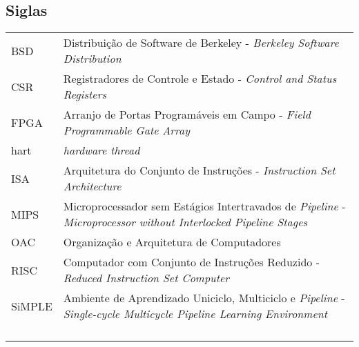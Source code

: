 


\subsection*{Siglas}

\begin{tabular}{p{}p{}}
    BSD & Distribuição de Software de Berkeley - \textit{Berkeley Software Distribution} \tabularnewline
    CSR & Registradores de Controle e Estado - \textit{Control and Status Registers} \tabularnewline
    FPGA & Arranjo de Portas Programáveis em Campo - \textit{Field Programmable Gate Array} \tabularnewline
    hart & \textit{hardware thread} \tabularnewline
    ISA & Arquitetura do Conjunto de Instruções - \textit{Instruction Set Architecture} \tabularnewline
    MIPS & Microprocessador sem Estágios Intertravados de \textit{Pipeline} - \textit{Microprocessor without Interlocked Pipeline Stages} \tabularnewline
    OAC & Organização e Arquitetura de Computadores \tabularnewline
    RISC & Computador com Conjunto de Instruções Reduzido - \textit{Reduced Instruction Set Computer} \tabularnewline
    SiMPLE & Ambiente de Aprendizado Uniciclo, Multiciclo e \textit{Pipeline} - \textit{Single-cycle Multicycle Pipeline Learning Environment} \tabularnewline
     &  \tabularnewline
     &  \tabularnewline
     &  \tabularnewline
     &  \tabularnewline
\end{tabular}
